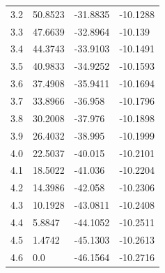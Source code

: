 \begin{tabular}{llll}
3.2 & 50.8523 & -31.8835 & -10.1288 \\
3.3 & 47.6639 & -32.8964 & -10.139 \\
3.4 & 44.3743 & -33.9103 & -10.1491 \\
3.5 & 40.9833 & -34.9252 & -10.1593 \\
3.6 & 37.4908 & -35.9411 & -10.1694 \\
3.7 & 33.8966 & -36.958 & -10.1796 \\
3.8 & 30.2008 & -37.976 & -10.1898 \\
3.9 & 26.4032 & -38.995 & -10.1999 \\
4.0 & 22.5037 & -40.015 & -10.2101 \\
4.1 & 18.5022 & -41.036 & -10.2204 \\
4.2 & 14.3986 & -42.058 & -10.2306 \\
4.3 & 10.1928 & -43.0811 & -10.2408 \\
4.4 & 5.8847 & -44.1052 & -10.2511 \\
4.5 & 1.4742 & -45.1303 & -10.2613 \\
4.6 & 0.0 & -46.1564 & -10.2716 \\
\bottomrule
\end{tabular}
